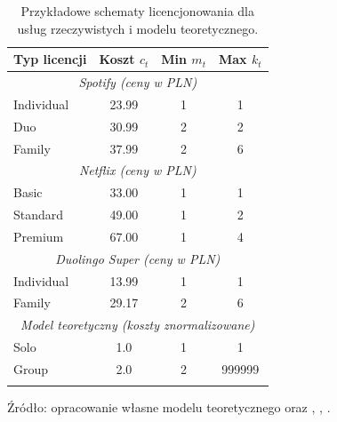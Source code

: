 \begin{table}[h!]
  \centering
  \caption{Przykładowe schematy licencjonowania dla usług rzeczywistych i modelu teoretycznego.}
  \begin{tabular}{lccc}
    \hline
    \textbf{Typ licencji} & \textbf{Koszt $c_t$} & \textbf{Min $m_t$} & \textbf{Max $k_t$} \\
    \hline
    \multicolumn{4}{c}{\textit{Spotify (ceny w PLN)}}                                      \\
    Individual            & 23.99                & 1                  & 1                  \\
    Duo                   & 30.99                & 2                  & 2                  \\
    Family                & 37.99                & 2                  & 6                  \\
    \hline
    \multicolumn{4}{c}{\textit{Netflix (ceny w PLN)}}                                      \\
    Basic                 & 33.00                & 1                  & 1                  \\
    Standard              & 49.00                & 1                  & 2                  \\
    Premium               & 67.00                & 1                  & 4                  \\
    \hline
    \multicolumn{4}{c}{\textit{Duolingo Super (ceny w PLN)}}                               \\
    Individual            & 13.99                & 1                  & 1                  \\
    Family                & 29.17                & 2                  & 6                  \\
    \hline
    \multicolumn{4}{c}{\textit{Model teoretyczny (koszty znormalizowane)}}                 \\
    Solo                  & 1.0                  & 1                  & 1                  \\
    Group                 & 2.0                  & 2                  & 999999             \\
    \hline
    \label{tab:license_models_real}
  \end{tabular}

  Źródło: opracowanie własne modelu teoretycznego oraz \cite{spotify_price2025}, \cite{netflix_price2025}, \cite{duolingo_app2024}.

\end{table}


